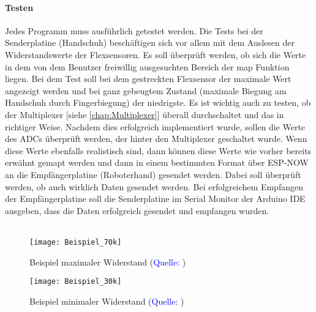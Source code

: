\documentclass[titlepage,12pt,twoside]{article}
\begin{document}
\paragraph{Testen}
\hfill \break
\hfill \break
Jedes Programm muss ausführlich getestet werden. Die Tests bei der Senderplatine (Handschuh) beschäftigen sich vor allem mit 
dem Auslesen der Widerstandswerte der Flexsensoren. Es soll überprüft werden, ob sich die Werte in dem von dem Benutzer 
freiwillig ausgesuchten Bereich der map Funktion liegen. Bei dem Test soll bei dem gestreckten Flexsensor der maximale Wert 
angezeigt werden und bei ganz gebeugtem Zustand (maximale Biegung am Handschuh durch Fingerbiegung) der niedrigste. Es ist 
wichtig auch zu testen, ob der Multiplexer [siehe \textcolor{blue}{\autoref{chap:Multiplexer}}] überall durchschaltet und das in richtiger Weise. Nachdem dies erfolgreich 
implementiert wurde, sollen die Werte des ADCs überprüft werden, der hinter den Multiplexer geschaltet wurde. Wenn diese Werte 
ebenfalls realistisch sind, dann können diese Werte wie vorher bereits erwähnt gemapt werden und dann in einem bestimmten Format 
über ESP-NOW an die Empfängerplatine (Roboterhand) gesendet werden. Dabei soll überprüft werden, ob auch wirklich Daten 
gesendet werden. Bei erfolgreichem Empfangen der Empfängerplatine soll die Senderplatine im Serial Monitor der Arduino IDE 
ausgeben, dass die Daten erfolgreich gesendet und empfangen wurden. \\
\\
\begin{figure}[H]
	\begin{center}
		\scalebox{0.7}
		{\texttt{[image: Beispiel\_70k]}}
		\caption{Beispiel maximaler Widerstand (\textcolor{blue}{Quelle: \cite{Pelayo}})}
		\label{fig:Beispiel_70k}			
	\end{center}
\end{figure}
\begin{figure}[H]
	\begin{center}
		\scalebox{0.7}
		{\texttt{[image: Beispiel\_30k]}}
		\caption{Beispiel minimaler Widerstand (\textcolor{blue}{Quelle: \cite{Pelayo}})}
		\label{fig:Beispiel_30k}			
	\end{center}
\end{figure}
\end{document}
